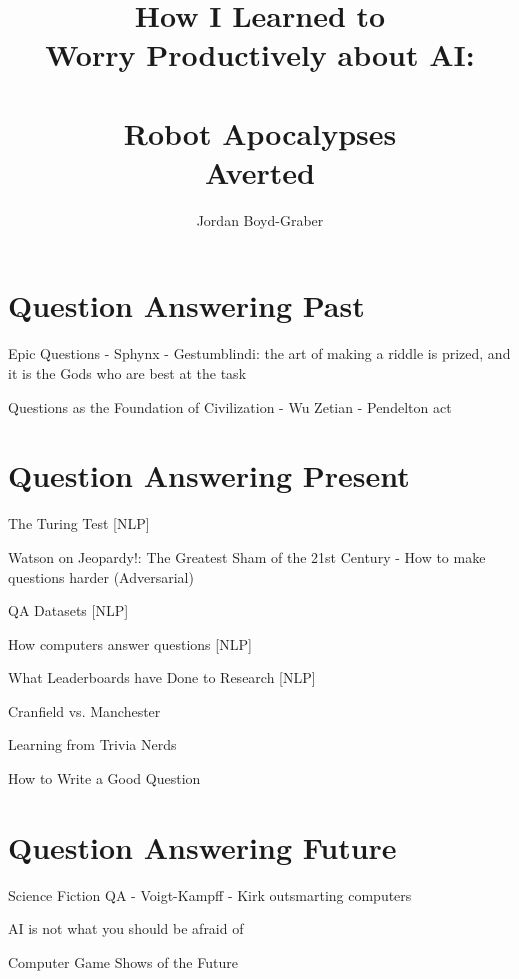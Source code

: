 \documentclass[bfivepaper,twosided,justified,nobib]{tufte-book}
\title{How I Learned to \\ Worry Productively about AI: \\  \\ Robot Apocalypses \\ Averted}
\author{Jordan Boyd-Graber}
\begin{document}






\clearpage

\part{Question Answering Past}

Epic Questions
- Sphynx
- Gestumblindi: the art of making a riddle is prized, and it is the
Gods who are best at the task

Questions as the Foundation of Civilization
- Wu Zetian
- Pendelton act


\part{Question Answering Present}

The Turing Test [NLP]

Watson on Jeopardy!: The Greatest Sham of the 21st Century 
 - How to make questions harder (Adversarial)

QA Datasets [NLP]

How computers answer questions [NLP]

What Leaderboards have Done to Research [NLP]

Cranfield vs. Manchester

Learning from Trivia Nerds

How to Write a Good Question

\part{Question Answering Future}

Science Fiction QA
- Voigt-Kampff
- Kirk outsmarting computers

AI is not what you should be afraid of

Computer Game Shows of the Future






\backmatter





\printindex
\end{document}
